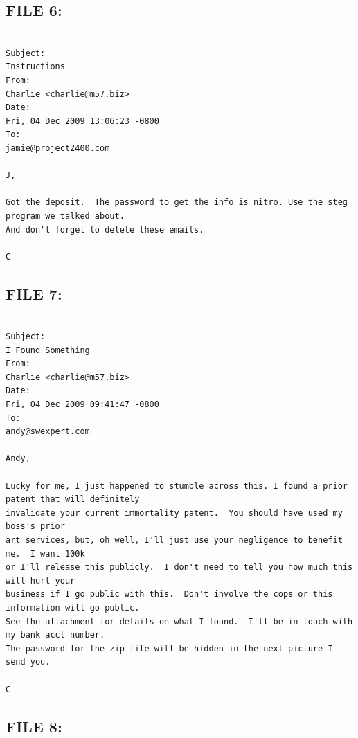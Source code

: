 \subsection{FILE 6:}
\label{sec:charlie_daten_6}

\begin{lstlisting}

Subject:
Instructions
From:
Charlie <charlie@m57.biz>
Date:
Fri, 04 Dec 2009 13:06:23 -0800
To:
jamie@project2400.com

J,

Got the deposit.  The password to get the info is nitro. Use the steg program we talked about.  
And don't forget to delete these emails.

C

\end{lstlisting}

\subsection{FILE 7:}
\label{sec:charlie_daten_7}

\begin{lstlisting}

Subject:
I Found Something
From:
Charlie <charlie@m57.biz>
Date:
Fri, 04 Dec 2009 09:41:47 -0800
To:
andy@swexpert.com

Andy,

Lucky for me, I just happened to stumble across this. I found a prior patent that will definitely 
invalidate your current immortality patent.  You should have used my boss's prior 
art services, but, oh well, I'll just use your negligence to benefit me.  I want 100k 
or I'll release this publicly.  I don't need to tell you how much this will hurt your 
business if I go public with this.  Don't involve the cops or this information will go public.  
See the attachment for details on what I found.  I'll be in touch with my bank acct number.  
The password for the zip file will be hidden in the next picture I send you.

C

\end{lstlisting}

\subsection{FILE 8:}
\label{sec:charlie_daten_8}

